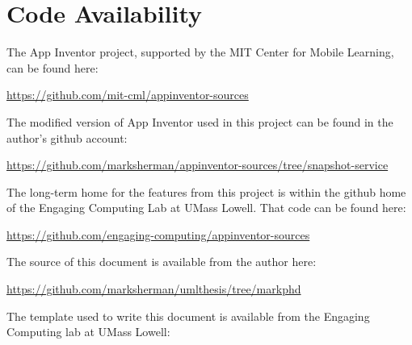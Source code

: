 




% 
% 




\chapter{Code Availability}

\noindent The App Inventor project, supported by the MIT Center for Mobile Learning, can be found here:

\noindent \url{https://github.com/mit-cml/appinventor-sources}

\noindent The modified version of App Inventor used in this project can be found in the author's github account:

\noindent \url{https://github.com/marksherman/appinventor-sources/tree/snapshot-service}

\noindent The long-term home for the features from this project is within the github home of the Engaging Computing Lab at UMass Lowell. That code can be found here:

\noindent \url{https://github.com/engaging-computing/appinventor-sources}

\noindent The source of this document is available from the author here:

\noindent \url{https://github.com/marksherman/umlthesis/tree/markphd}

\noindent The template used to write this document is available from the Engaging Computing lab at UMass Lowell:

